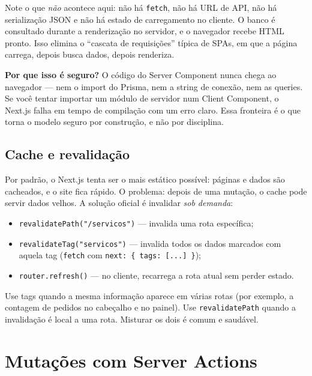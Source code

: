 Note o que \emph{não} acontece aqui: não há \texttt{fetch}, não há URL de API,
não há serialização JSON e não há estado de carregamento no cliente. O banco é
consultado durante a renderização no servidor, e o navegador recebe HTML
pronto. Isso elimina o ``cascata de requisições'' típica de SPAs, em que a
página carrega, depois busca dados, depois renderiza.

\begin{caixaconceito}
\textbf{Por que isso é seguro?} O código do Server Component nunca chega ao
navegador — nem o import do Prisma, nem a string de conexão, nem as queries.
Se você tentar importar um módulo de servidor num Client Component, o Next.js
falha em tempo de compilação com um erro claro. Essa fronteira é o que torna o
modelo seguro por construção, e não por disciplina.
\end{caixaconceito}

\subsection{Cache e revalidação}

Por padrão, o Next.js tenta ser o mais estático possível: páginas e dados são
cacheados, e o site fica rápido. O problema: depois de uma mutação, o cache
pode servir dados velhos. A solução oficial é invalidar \emph{sob demanda}:

\begin{itemize}[leftmargin=*, itemsep=0.4em]
  \item \texttt{revalidatePath("/servicos")} — invalida uma rota específica;
  \item \texttt{revalidateTag("servicos")} — invalida todos os dados marcados com aquela tag (\texttt{fetch} com \texttt{next: \{ tags: [...] \}});
  \item \texttt{router.refresh()} — no cliente, recarrega a rota atual sem perder estado.
\end{itemize}

\begin{caixadica}
Use tags quando a mesma informação aparece em várias rotas (por exemplo, a
contagem de pedidos no cabeçalho e no painel). Use \texttt{revalidatePath}
quando a invalidação é local a uma rota. Misturar os dois é comum e saudável.
\end{caixadica}

\section{Mutações com Server Actions}


